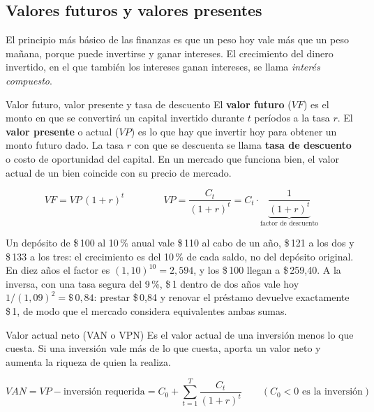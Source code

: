 \subsection{Valores futuros y valores presentes}

El principio más básico de las finanzas es que un peso hoy vale más que un peso mañana, porque puede invertirse y ganar intereses. El crecimiento del dinero invertido, en el que también los intereses ganan intereses, se llama \emph{interés compuesto}.

\begin{definicion}{Valor futuro, valor presente y tasa de descuento}
El \textbf{valor futuro} ($VF$) es el monto en que se convertirá un capital invertido durante $t$ períodos a la tasa $r$. El \textbf{valor presente} o actual ($VP$) es lo que hay que invertir hoy para obtener un monto futuro dado. La tasa $r$ con que se descuenta se llama \textbf{tasa de descuento} o costo de oportunidad del capital. En un mercado que funciona bien, el valor actual de un bien coincide con su precio de mercado.
\end{definicion}

\begin{formulaBox}
\[
VF = VP\,(1+r)^{t}
\qquad\qquad
VP = \frac{C_t}{(1+r)^{t}} = C_t \cdot \underbrace{\frac{1}{(1+r)^{t}}}_{\text{factor de descuento}}
\]
\end{formulaBox}

\begin{ejemplo}
Un depósito de \$\,100 al 10\,\% anual vale \$\,110 al cabo de un año, \$\,121 a los dos y \$\,133 a los tres: el crecimiento es del 10\,\% de cada saldo, no del depósito original. En diez años el factor es $(1{,}10)^{10} = 2{,}594$, y los \$\,100 llegan a \$\,259,40. A la inversa, con una tasa segura del 9\,\%, \$\,1 dentro de dos años vale hoy $1/(1{,}09)^2 = \$\,0{,}84$: prestar \$\,0,84 y renovar el préstamo devuelve exactamente \$\,1, de modo que el mercado considera equivalentes ambas sumas.
\end{ejemplo}

\begin{definicion}{Valor actual neto (VAN o VPN)}
Es el valor actual de una inversión menos lo que cuesta. Si una inversión vale más de lo que cuesta, aporta un valor neto y aumenta la riqueza de quien la realiza.
\end{definicion}

\begin{formulaBox}
\[
VAN = VP - \text{inversión requerida}
= C_0 + \sum_{t=1}^{T}\frac{C_t}{(1+r)^{t}}
\qquad (C_0 < 0 \text{ es la inversión})
\]
\end{formulaBox}

